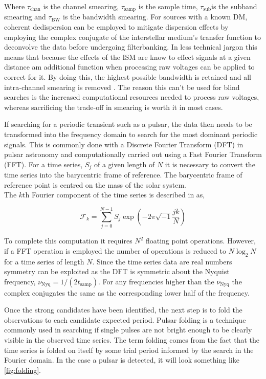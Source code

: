 Where $\tau_\text{chan}$ is the channel smearing, $\tau_\text{samp}$ is the sample time, $\tau_\text{sub}$is the subband smearing and $\tau_\text{BW}$ is the bandwidth smearing. For sources with a known DM, coherent dedispersion can be employed to mitigate dispersion effects by employing the complex conjugate of the interstellar medium's transfer function to deconvolve the data before undergoing filterbanking. In less technical jargon this means that because the effects of the ISM are know to effect signals at a given distance am additional function when processing raw voltages can be applied to correct for it. By doing this, the highest possible bandwidth is retained and all intra-channel smearing is removed \citep{hankins_pulsar_1975}. The reason this can't be used for blind searches is the increased computational resources needed to process raw voltages, whereas sacrificing the trade-off in smearing is worth it in most cases. 


If searching for a periodic transient such as a pulsar, the data then needs to be transformed into the frequency domain to search for the most dominant periodic signals. This is commonly done with a Discrete Fourier Transform (DFT) in pulsar astronomy and computationally carried out using a Fast Fourier Transform (FFT). For a time series, $S_j$ of a given length of $N$ it is necessary to convert the time series into the barycentric frame of reference. The barycentric frame of reference point is centred on the mass of the solar system. \\ The $k$th Fourier component of the time series is described in \citet[pp.~132--134]{pulsar_handbook} as,

\begin{equation}
    \mathcal{F}_k = \sum_{j=0}^{N-1} S_j \exp\left(-2\pi \sqrt{-1} \frac{jk}{N}\right)
\end{equation}

To complete this computation it requires $N^2$ floating point operations. However, if a FFT operation is employed the number of operations is reduced to $N \log_2 N$ for a time series of length $N$. Since the time series data are real numbers symmetry can be exploited as the DFT is symmetric about the Nyquist frequency, $\nu_{\text{Nyq}} = 1/(2 t_{\text{samp}})$. For any frequencies higher than the $\nu_{\text{Nyq}}$ the complex conjugates the same as the corresponding lower half of the frequency.

Once the strong candidates have been identified, the next step is to fold the observations to each candidate expected period. Pulsar folding is a technique commonly used in searching if single pulses are not bright enough to be clearly visible in the observed time series. The term folding comes from the fact that the time series is folded on itself by some trial period informed by the search in the Fourier domain. In the case a pulsar is detected, it will look something like \cref{fig:folding}. 

